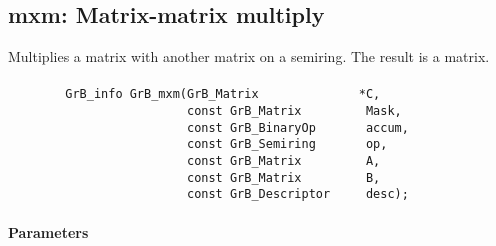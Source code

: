 \subsection{{\sf mxm}: Matrix-matrix multiply}

Multiplies a matrix with another matrix on a semiring. The result is a matrix.

\paragraph{\syntax}

\begin{verbatim}
        GrB_info GrB_mxm(GrB_Matrix              *C,
                         const GrB_Matrix         Mask,
                         const GrB_BinaryOp       accum,
                         const GrB_Semiring       op,
                         const GrB_Matrix         A, 
                         const GrB_Matrix         B,
                         const GrB_Descriptor     desc);
\end{verbatim}

\paragraph{Parameters}

